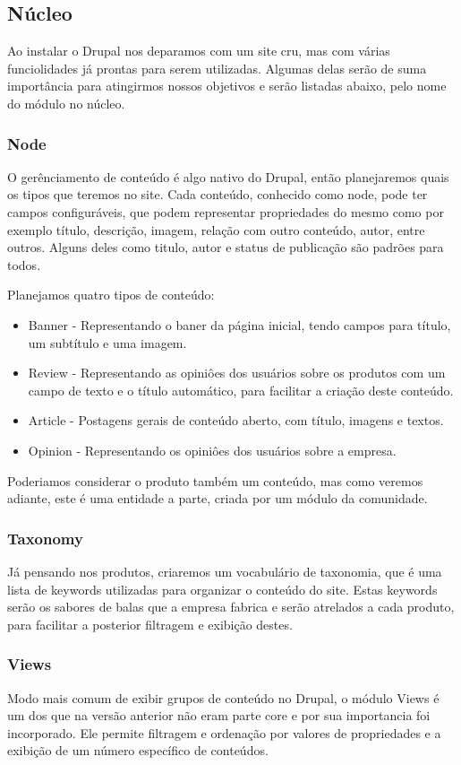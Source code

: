 \subsection{Núcleo}

Ao instalar o Drupal nos deparamos com um site cru, mas com várias funciolidades já prontas para serem utilizadas. Algumas delas serão de suma importância para atingirmos nossos objetivos e serão listadas abaixo, pelo nome do módulo no núcleo.

\subsubsection{Node}
O gerênciamento de conteúdo é algo nativo do Drupal, então planejaremos quais os tipos que teremos no site. Cada conteúdo, conhecido como node, pode ter campos configuráveis, que podem representar propriedades do mesmo como por exemplo título, descrição, imagem, relação com outro conteúdo, autor, entre outros. Alguns deles como titulo, autor e status de publicação são padrões para todos.

Planejamos quatro tipos de conteúdo:
\begin{itemize}
  \item Banner - Representando o baner da página inicial, tendo campos para título, um subtítulo e uma imagem.
  \item Review - Representando as opiniôes dos usuários sobre os produtos com um campo de texto e o título automático, para facilitar a criação deste conteúdo.
  \item Article - Postagens gerais de conteúdo aberto, com título, imagens e textos.
  \item Opinion - Representando os opiniôes dos usuários sobre a empresa.
\end{itemize}

Poderiamos considerar o produto também um conteúdo, mas como veremos adiante, este é uma entidade a parte, criada por um módulo da comunidade.

\subsubsection{Taxonomy}
Já pensando nos produtos, criaremos um vocabulário de taxonomia, que é uma lista de keywords utilizadas para organizar o conteúdo do site. Estas keywords serão os sabores de balas que a empresa fabrica e serão atrelados a cada produto, para facilitar a posterior filtragem e exibição destes.

\subsubsection{Views}
Modo mais comum de exibir grupos de conteúdo no Drupal, o módulo Views é um dos que na versão anterior não eram parte core e por sua importancia foi incorporado. Ele permite filtragem e ordenação por valores de propriedades e a exibição de um número específico de conteúdos. 

